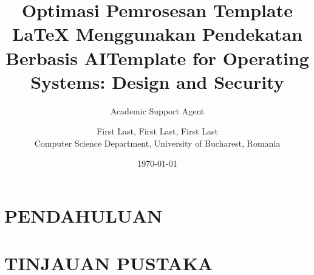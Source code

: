 \documentclass{article}
\title{Optimasi Pemrosesan Template LaTeX Menggunakan Pendekatan Berbasis AI}
\author{Academic Support Agent}
\date{\today}
\begin{document}
\maketitle

\begin{abstract}

\end{abstract}

\chapter{PENDAHULUAN}


\chapter{TINJAUAN PUSTAKA}


\usepackage{babel}
\usepackage[utf8]{inputenc}
\usepackage[T1]{fontenc}
\usepackage{hyperref}
\usepackage{graphicx}
\usepackage[ruled,vlined,linesnumbered]{algorithm2e}
\usepackage{bm}
\newcommand{\eref}[1]{(\ref{#1})}
\title{Template for Operating Systems: Design and Security}

\author{
    First Last, 
    First Last,
    First Last\\
	\footnotesize Computer Science Department, University of Bucharest, Romania
}

\date{\empty} %
\end{document}
